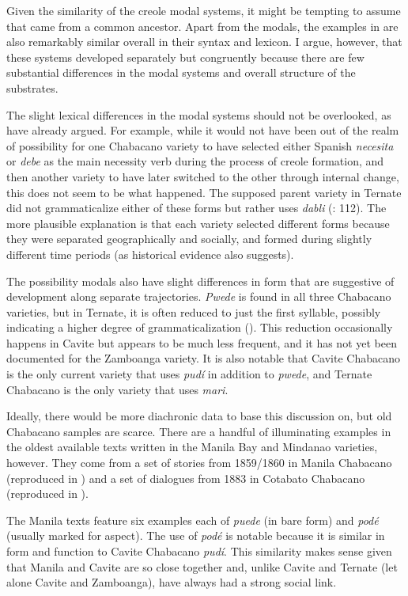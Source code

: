 \documentclass[output=paper,colorlinks,citecolor=brown]{langscibook}
\begin{document}
Given the similarity of the creole modal systems, it might be tempting to assume that came from a common ancestor. Apart from the modals, the examples in  are also remarkably similar overall in their syntax and lexicon. I argue, however, that these systems developed separately but congruently because there are few substantial differences in the modal systems and overall structure of the substrates.

The slight lexical differences in the modal systems should not be overlooked, as \citet{SippolaLesho2020} have already argued. For example, while it would not have been out of the realm of possibility for one Chabacano variety to have selected either Spanish \textit{necesita} or \textit{debe} as the main necessity verb during the process of creole formation, and then another variety to have later switched to the other through internal change, this does not seem to be what happened. The supposed parent variety in Ternate did not grammaticalize either of these forms but rather uses \textit{dabli} (\citealt{SippolaLesho2020}: 112). The more plausible explanation is that each variety selected different forms because they were separated geographically and socially, and formed during slightly different time periods (as historical evidence also suggests). 

The possibility modals also have slight differences in form that are suggestive of development along separate trajectories. \textit{Pwede} is found in all three Chabacano varieties, but in Ternate, it is often reduced to just the first syllable, possibly indicating a higher degree of grammaticalization (\citealt{SippolaLesho2020}). This reduction occasionally happens in Cavite but appears to be much less frequent, and it has not yet been documented for the Zamboanga variety. It is also notable that Cavite Chabacano is the only current variety that uses \textit{pudí} in addition to \textit{pwede}, and Ternate Chabacano is the only variety that uses \textit{mari}.

Ideally, there would be more diachronic data to base this discussion on, but old Chabacano samples are scarce. There are a handful of illuminating examples in the oldest available texts written in the Manila Bay and Mindanao varieties, however. They come from a set of stories from 1859/1860 in Manila Chabacano (reproduced in \citealt{FernándezSippola2017}) and a set of dialogues from 1883 in Cotabato Chabacano (reproduced in \citealt{Fernández2012elchab}). 

The Manila texts feature six examples each of \textit{puede} (in bare form) and \textit{podé} (usually marked for aspect). The use of \textit{podé} is notable because it is similar in form and function to Cavite Chabacano \textit{pudí}. This similarity makes sense given that Manila and Cavite are so close together and, unlike Cavite and Ternate (let alone Cavite and Zamboanga), have always had a strong social link. 
\end{document}
